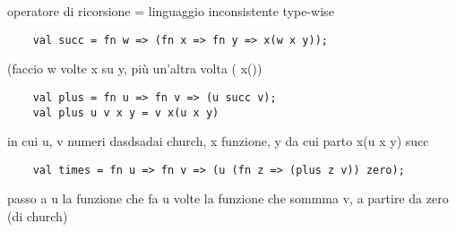 \documentclass[a4paper,11pt]{report}
\begin{document}
operatore di ricorsione = linguaggio inconsistente type-wise

\begin{lstlisting}
    val succ = fn w => (fn x => fn y => x(w x y));
\end{lstlisting}
(faccio w volte x su y, più un'altra volta ( x())

\begin{lstlisting}
    val plus = fn u => fn v => (u succ v);
    val plus u v x y = v x(u x y)
\end{lstlisting}
in cui u, v numeri dasdsadai church, x funzione, y da cui parto
x(u x y) succ

\begin{lstlisting}
    val times = fn u => fn v => (u (fn z => (plus z v)) zero);
\end{lstlisting}
passo a u la funzione che fa u volte la funzione che sommma v, a partire da zero (di church)
\end{document}
